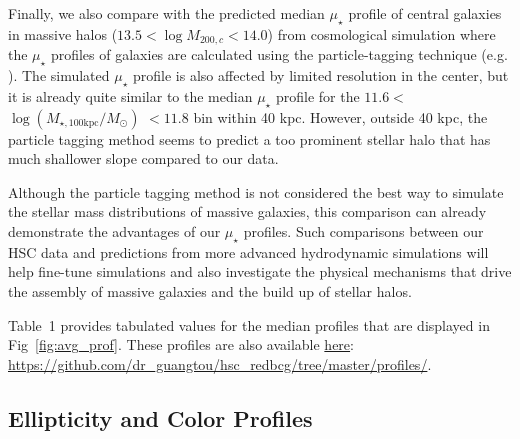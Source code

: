 \documentclass[a4paper,fleqn,usenatbib]{mnras}
\def\logmtot{{$\log (M_{\star,100\mathrm{kpc}}/M_{\odot})$}}
\def\mden{{$\mu_{\star}$}}
\begin{document}
    Finally, we also compare with the predicted median \mden{} profile of central 
    galaxies in massive halos ($13.5 < \log M_{200,c} < 14.0$) from cosmological 
    simulation where the \mden{} profiles of galaxies are calculated using the 
    particle-tagging technique (e.g. \citealt{Cooper2010}). 
    The simulated \mden{} profile is also affected by limited resolution in the 
    center, but it is already quite similar to the median \mden{} profile for 
    the $11.6 <$ \logmtot{} $< 11.8$ bin within 40 kpc. 
    However, outside 40 kpc, the particle tagging method seems to predict a too 
    prominent stellar halo that has much shallower slope compared to our data.
    
    Although the particle tagging method is not considered the best way to simulate
    the stellar mass distributions of massive galaxies, this comparison can already 
    demonstrate the advantages of our \mden{} profiles. 
    Such comparisons between our HSC data and predictions from more advanced 
    hydrodynamic simulations will help fine-tune simulations and also investigate 
    the physical mechanisms that drive the assembly of massive galaxies and the 
    build up of stellar halos.

    Table~1 provides tabulated values for the median profiles that are 
    displayed in Fig~\ref{fig:avg_prof}. 
    These profiles are also available  
    \href{https://github.com/dr-guangtou/hsc_redbcg/tree/master/profiles}{here}:
    {\url{https://github.com/dr_guangtou/hsc_redbcg/tree/master/profiles/}}.
    

\subsection{Ellipticity and Color Profiles}
    \label{ssec:ell_color}
    
\end{document}
